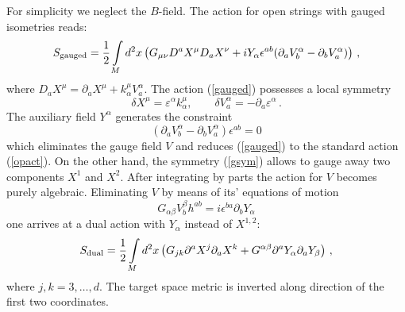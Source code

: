 \documentclass[a4paper,12pt,twoside]{article}
\begin{document}
For simplicity we neglect the $B$-field.
The action for open strings with gauged isometries reads:
\begin{equation}
S_{{\mbox {\scriptsize {gauged}}}}=\frac 12 \int\limits_M
d^2x \left( G_{\mu\nu}D^a X^\mu D_a X^\nu +iY_\alpha \epsilon^{ab}
(\partial_a V_b^\alpha -\partial_b V_a^\alpha ) \right) \,,
\label{gauged}
\end{equation}
where $D_a X^\mu =\partial_a X^\mu +k^\mu_\alpha V^\alpha_a$. 
The action (\ref{gauged}) possesses a local symmetry
\begin{equation}
\delta X^\mu =\varepsilon^\alpha k_\alpha^\mu ,\qquad
\delta V_a^\alpha =-\partial_a \varepsilon^\alpha \,.
\label{gsym}
\end{equation}
The auxiliary field
$Y^\alpha$ generates the constraint
\begin{equation}
(\partial_a V_b^\alpha -\partial_b V_a^\alpha )\epsilon^{ab}=0
\label{constr}
\end{equation}
which eliminates the gauge field $V$ and reduces (\ref{gauged})
to the standard action (\ref{opact}). On the other hand,
the symmetry (\ref{gsym}) 
allows to gauge away two components $X^1$ and $X^2$.
After integrating by parts the
action for $V$ becomes purely algebraic. Eliminating
$V$ by means of its' equations of motion 
\begin{equation}
G_{\alpha\beta}V_b^\beta h^{ab} =i\epsilon^{ba} \partial_b Y_\alpha
\label{Veom}
\end{equation} 
one arrives at a
dual action with $Y_\alpha$ instead of $X^{1,2}$:
\begin{equation}
S_{{\mbox {\scriptsize {dual}}}}=\frac 12 \int\limits_M
d^2x \left( G_{jk}\partial^a X^j \partial_a X^k +G^{\alpha\beta}
\partial^a Y_\alpha \partial_a Y_\beta \right)\,, 
\label{Sdual}
\end{equation}
where $j,k=3,\dots,d$. The target space metric is inverted
along direction of the first two coordinates.
\end{document}
